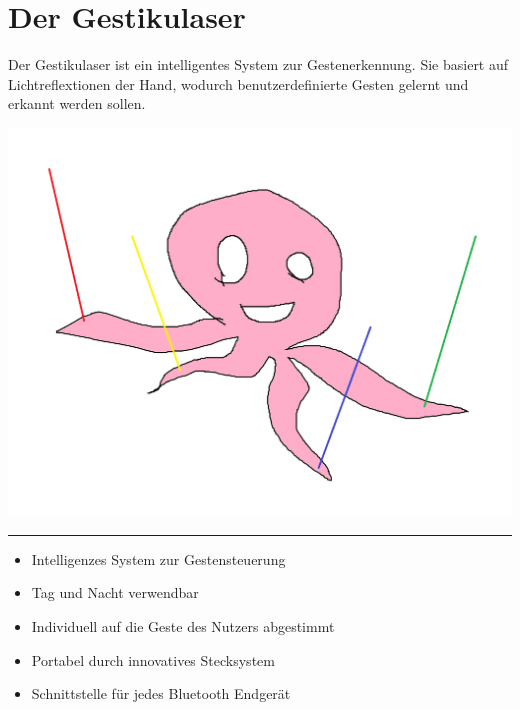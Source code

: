 \documentclass[a4paper,12pt,notumble]{leaflet}
\begin{document}
\newpage
\raggedright



\noindent
\begin{minipage}[c][0.45\textheight][t]{\textwidth}
	\section{Der Gestikulaser}

	Der Gestikulaser ist ein intelligentes System zur Gestenerkennung. Sie basiert auf Lichtreflextionen der Hand, wodurch benutzerdefinierte Gesten gelernt und
	erkannt werden sollen. 

	\begin{flushright}
		\includegraphics[scale=0.2]{../Logos/gestikulaser.png}
	\end{flushright}
\end{minipage}

\textcolor{rwth-lblue}{\noindent\rule{\textwidth}{4pt}}

\noindent
\begin{minipage}[c][0.45\textheight][t]{\textwidth}
	\begin{itemize}
		\item Intelligenzes System zur Gestensteuerung
		\item Tag und Nacht verwendbar
		\item Individuell auf die Geste des Nutzers abgestimmt
		\item Portabel durch innovatives Stecksystem
		\item Schnittstelle für jedes Bluetooth Endgerät
	\end{itemize}
\end{minipage}
\end{document}
